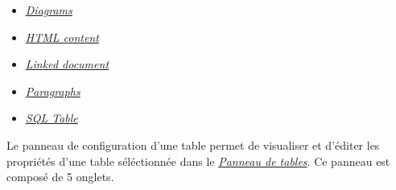 \documentclass[letterpaper,10pt,french]{sphinxmanual}
\begin{document}
{\begin{minipage}{0.95\linewidth}
\begin{itemize}
\begin{itemize}
\begin{itemize}
\begin{itemize}
\item {} 
\label{tables/infopanel:id12}{\hyperref[tables/infopanel:diagrams]{\emph{Diagrams}}}

\item {} 
\label{tables/infopanel:id13}{\hyperref[tables/infopanel:html-content]{\emph{HTML content}}}

\item {} 
\label{tables/infopanel:id14}{\hyperref[tables/infopanel:linked-document]{\emph{Linked document}}}

\item {} 
\label{tables/infopanel:id15}{\hyperref[tables/infopanel:paragraphs]{\emph{Paragraphs}}}

\item {} 
\label{tables/infopanel:id16}{\hyperref[tables/infopanel:sql-table]{\emph{SQL Table}}}

\end{itemize}

\end{itemize}

\end{itemize}

\end{itemize}
\end{minipage}}
\begin{center}\setlength{\fboxsep}{5pt}\end{center}

Le panneau de configuration d'une table permet de visualiser et d'éditer
les propriétés d'une table séléctionnée dans le {\hyperref[tables/tbllist::doc]{\emph{\emph{Panneau de tables}}}}. Ce
panneau est composé de 5 onglets.
\end{document}
